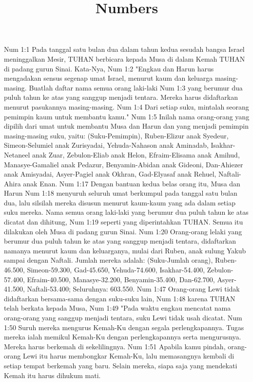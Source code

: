 

\title{Numbers}

Num 1:1  Pada tanggal satu bulan dua dalam tahun kedua sesudah bangsa Israel meninggalkan Mesir, TUHAN berbicara kepada Musa di dalam Kemah TUHAN di padang gurun Sinai. Kata-Nya,
Num 1:2  "Engkau dan Harun harus mengadakan sensus segenap umat Israel, menurut kaum dan keluarga masing-masing. Buatlah daftar nama semua orang laki-laki
Num 1:3  yang berumur dua puluh tahun ke atas yang sanggup menjadi tentara. Mereka harus didaftarkan menurut pasukannya masing-masing.
Num 1:4  Dari setiap suku, mintalah seorang pemimpin kaum untuk membantu kamu."
Num 1:5  Inilah nama orang-orang yang dipilih dari umat untuk membantu Musa dan Harun dan yang menjadi pemimpin masing-masing suku, yaitu: (Suku-Pemimpin), Ruben-Elizur anak Syedeur, Simeon-Selumiel anak Zurisyadai, Yehuda-Nahason anak Aminadab, Isakhar-Netaneel anak Zuar, Zebulon-Eliab anak Helon, Efraim-Elisama anak Amihud, Manasye-Gamaliel anak Pedazur, Benyamin-Abidan anak Gideoni, Dan-Ahiezer anak Amisyadai, Asyer-Pagiel anak Okhran, Gad-Elyasaf anak Rehuel, Naftali-Ahira anak Enan.
Num 1:17  Dengan bantuan kedua belas orang itu, Musa dan Harun
Num 1:18  menyuruh seluruh umat berkumpul pada tanggal satu bulan dua, lalu silsilah mereka disusun menurut kaum-kaum yang ada dalam setiap suku mereka. Nama semua orang laki-laki yang berumur dua puluh tahun ke atas dicatat dan dihitung,
Num 1:19  seperti yang diperintahkan TUHAN. Semua itu dilakukan oleh Musa di padang gurun Sinai.
Num 1:20  Orang-orang lelaki yang berumur dua puluh tahun ke atas yang sanggup menjadi tentara, didaftarkan namanya menurut kaum dan keluarganya, mulai dari Ruben, anak sulung Yakub sampai dengan Naftali. Jumlah mereka adalah: (Suku-Jumlah orang), Ruben-46.500, Simeon-59.300, Gad-45.650, Yehuda-74.600, Isakhar-54.400, Zebulon-57.400, Efraim-40.500, Manasye-32.200, Benyamin-35.400, Dan-62.700, Asyer-41.500, Naftali-53.400; Seluruhnya: 603.550.
Num 1:47  Orang-orang Lewi tidak didaftarkan bersama-sama dengan suku-suku lain,
Num 1:48  karena TUHAN telah berkata kepada Musa,
Num 1:49  "Pada waktu engkau mencatat nama orang-orang yang sanggup menjadi tentara, suku Lewi tidak usah dicatat.
Num 1:50  Suruh mereka mengurus Kemah-Ku dengan segala perlengkapannya. Tugas mereka ialah memikul Kemah-Ku dengan perlengkapannya serta mengurusnya. Mereka harus berkemah di sekelilingnya.
Num 1:51  Apabila kamu pindah, orang-orang Lewi itu harus membongkar Kemah-Ku, lalu memasangnya kembali di setiap tempat berkemah yang baru. Selain mereka, siapa saja yang mendekati Kemah itu harus dihukum mati.
